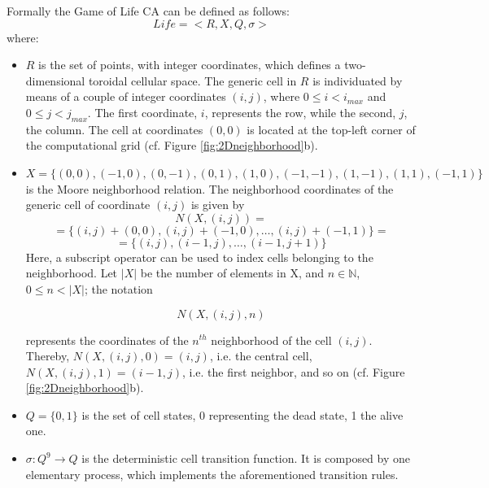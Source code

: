 Formally the Game of Life CA can be defined as follows:
$$Life = < R, X, Q, \sigma >$$ where:
\begin{itemize}
	\item $R$ is the set of points, with integer coordinates, which
	defines a two-dimensional toroidal cellular space. The generic
	cell in $R$ is individuated by means of a couple of integer
	coordinates $(i, j)$, where $0 \leq i < i_{max}$ and $0 \leq j <
	j_{max}$. The first coordinate, $i$, represents the row, while
	the second, $j$, the column. The cell at coordinates $(0,0)$ is
	located at the top-left corner of the computational grid
	(cf. Figure \ref{fig:2Dneighborhood}b).
	
	\item $X = \{(0,0), (-1, 0), (0, -1), (0, 1), (1, 0), (-1,-1),
	(1,-1), (1,1), (-1,1)\}$ is the Moore neighborhood relation. The
	neighborhood coordinates of the generic cell of coordinate $(i,
	j)$ is given by
	$$N(X, (i, j)) = $$
	$$= \{(i, j)+(0,0), (i, j)+(-1, 0), \dots, (i, j)+(-1,1)\} =$$
	$$= \{(i, j), (i-1, j), \dots, (i-1,j+1)\}$$ Here, a subscript
	operator can be used to index cells belonging to the
	neighborhood. Let $|X|$ be the number of elements in X, and $n
	\in \mathbb{N}$, $0 \leq n < |X|$; the notation
	
	$$N(X, (i, j), n)$$
	
	represents the coordinates of the $n^{th}$ neighborhood of the
	cell $(i,j)$. Thereby, $N(X, (i, j), 0) = (i, j)$, i.e. the
	central cell, $N(X, (i, j), 1) = (i-1, j)$, i.e. the first
	neighbor, and so on (cf. Figure \ref{fig:2Dneighborhood}b).
	
	\item $Q = \{0, 1\}$ is the set of cell states, 0 representing the
	dead state, 1 the alive one.
	
	\item $\sigma : Q^9 \rightarrow Q$ is the deterministic cell
	transition function. It is composed by one elementary process,
	which implements the aforementioned transition rules.
\end{itemize}

